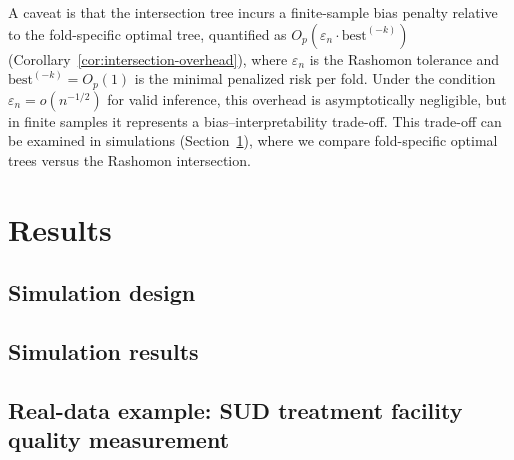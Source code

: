 \documentclass[12pt]{article}
\begin{document}
A caveat is that the intersection tree incurs a finite-sample bias penalty relative to the fold-specific optimal tree, quantified as $O_p(\varepsilon_n \cdot \text{best}^{(-k)})$ (Corollary~\ref{cor:intersection-overhead}), where $\varepsilon_n$ is the Rashomon tolerance and $\text{best}^{(-k)} = O_p(1)$ is the minimal penalized risk per fold. Under the condition $\varepsilon_n = o(n^{-1/2})$ for valid inference, this overhead is asymptotically negligible, but in finite samples it represents a bias--interpretability trade-off. This trade-off can be examined in simulations (Section~\ref{sec:results}), where we compare fold-specific optimal trees versus the Rashomon intersection.

\section{Results}
\label{sec:results}

\subsection{Simulation design}

\subsection{Simulation results}

\subsection{Real-data example: SUD treatment facility quality measurement}
\end{document}
